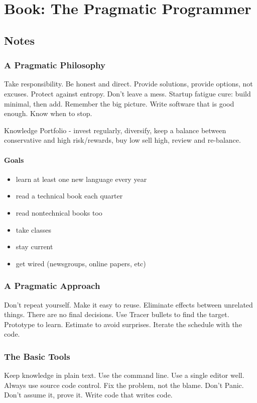 \twocolumn
\chapter{Book: The Pragmatic Programmer}
\section{Notes}
\subsection{A Pragmatic Philosophy}
Take responsibility. Be honest and direct. Provide solutions, provide options, not excuses.    
Protect against entropy. Don't leave a mess.   
Startup fatigue cure: build minimal, then add. Remember the big picture.    
Write software that is good enough. Know when to stop.

Knowledge Portfolio - invest regularly, diversify, keep a balance between conservative and high risk/rewards, buy low sell high, review and re-balance.

\subsubsection{Goals}
\begin{itemize}
\item learn at least one new language every year
\item read a technical book each quarter
\item read nontechnical books too
\item take classes
\item stay current
\item get wired (newsgroups, online papers, etc)
\end{itemize}

\subsection{A Pragmatic Approach}

Don't repeat yourself. Make it easy to reuse. Eliminate effects between unrelated things. There are no final decisions. Use Tracer bullets to find the target. Prototype to learn. Estimate to avoid surprises. Iterate the schedule with the code.

\subsection{The Basic Tools}
Keep knowledge in plain text. Use the command line. Use a single editor well. Always use source code control. Fix the problem, not the blame. Don't Panic. Don't assume it, prove it. Write code that writes code.
